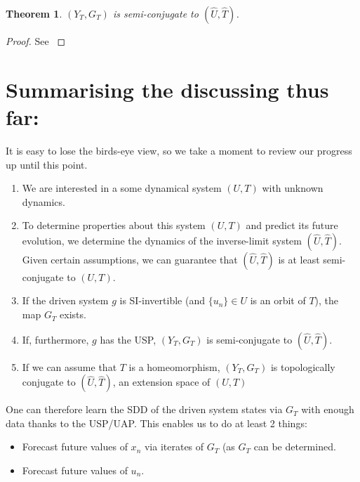 \documentclass[a4paper,12pt,twoside]{report}
\newtheorem{Theorem}{Theorem}[]
\begin{document}
\begin{Theorem}
    $(Y_T, G_T)$ is semi-conjugate to $(\widehat{U}, \widehat{T})$.
\end{Theorem}
\begin{proof}
  See \cite[Th.3, Th.4]{manunath2021universal}
\end{proof}


\section*{Summarising the discussing thus far:}

It is easy to lose the birds-eye view, so we take a moment to review our progress up until this point.

\vspace{-8mm}
\begin{enumerate}
\item We are interested in a some dynamical system $(U,T)$ with unknown dynamics.
\item To determine properties about this system $(U,T)$ and predict its future evolution, we determine the dynamics of the inverse-limit system $(\widehat{U}, \widehat{T})$. Given certain assumptions, we can guarantee that $(\widehat{U}, \widehat{T})$ is at least semi-conjugate to $(U,T)$.
\item If the driven system $g$ is SI-invertible (and $\{u_n\}\in{U}$  is an orbit of $T$), the map $G_T$ exists. 
\item If, furthermore, $g$ has the USP, $(Y_T, G_T)$ is semi-conjugate to $(\widehat{U}, \widehat{T})$.
\item If we can assume that $T$ is a homeomorphism, $(Y_T, G_T)$ is topologically conjugate to $(\widehat{U}, \widehat{T})$, an extension space of $(U,T)$
\end{enumerate} 

One can therefore learn the SDD of the driven system states via $G_T$ with enough data thanks to the USP/UAP. This enables us to do at least 2 things: 
\vspace{-8mm}
\begin{itemize}[noitemsep]
\item Forecast future values of $x_n$ via iterates of $G_T$ (as $G_T$ can be determined.
\item Forecast future values of $u_n$. 
\end{itemize} 

\end{document}
